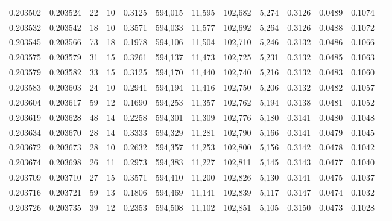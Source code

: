 \begin{tabular}{rrrrrrrrrrrrr}
0.203502 & 0.203524 &    22 &  10 &                                     0.3125 & 594,015 &  11,595 & 102,682 &   5,274 & 0.3126 & 0.0489 & 0.1074 \\
0.203532 & 0.203542 &    18 &  10 &                                     0.3571 & 594,033 &  11,577 & 102,692 &   5,264 & 0.3126 & 0.0488 & 0.1072 \\
0.203545 & 0.203566 &    73 &  18 &                                     0.1978 & 594,106 &  11,504 & 102,710 &   5,246 & 0.3132 & 0.0486 & 0.1066 \\
0.203575 & 0.203579 &    31 &  15 &                                     0.3261 & 594,137 &  11,473 & 102,725 &   5,231 & 0.3132 & 0.0485 & 0.1063 \\
0.203579 & 0.203582 &    33 &  15 &                                     0.3125 & 594,170 &  11,440 & 102,740 &   5,216 & 0.3132 & 0.0483 & 0.1060 \\
0.203583 & 0.203603 &    24 &  10 &                                     0.2941 & 594,194 &  11,416 & 102,750 &   5,206 & 0.3132 & 0.0482 & 0.1057 \\
0.203604 & 0.203617 &    59 &  12 &                                     0.1690 & 594,253 &  11,357 & 102,762 &   5,194 & 0.3138 & 0.0481 & 0.1052 \\
0.203619 & 0.203628 &    48 &  14 &                                     0.2258 & 594,301 &  11,309 & 102,776 &   5,180 & 0.3141 & 0.0480 & 0.1048 \\
0.203634 & 0.203670 &    28 &  14 &                                     0.3333 & 594,329 &  11,281 & 102,790 &   5,166 & 0.3141 & 0.0479 & 0.1045 \\
0.203672 & 0.203673 &    28 &  10 &                                     0.2632 & 594,357 &  11,253 & 102,800 &   5,156 & 0.3142 & 0.0478 & 0.1042 \\
0.203674 & 0.203698 &    26 &  11 &                                     0.2973 & 594,383 &  11,227 & 102,811 &   5,145 & 0.3143 & 0.0477 & 0.1040 \\
0.203709 & 0.203710 &    27 &  15 &                                     0.3571 & 594,410 &  11,200 & 102,826 &   5,130 & 0.3141 & 0.0475 & 0.1037 \\
0.203716 & 0.203721 &    59 &  13 &                                     0.1806 & 594,469 &  11,141 & 102,839 &   5,117 & 0.3147 & 0.0474 & 0.1032 \\
0.203726 & 0.203735 &    39 &  12 &                                     0.2353 & 594,508 &  11,102 & 102,851 &   5,105 & 0.3150 & 0.0473 & 0.1028 \\

\end{tabular}
